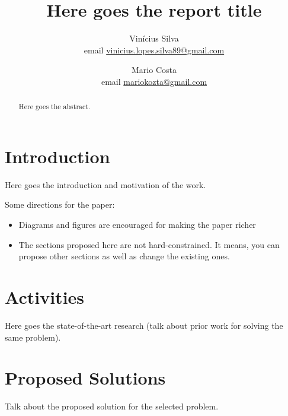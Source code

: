 \documentclass[10pt,twocolumn,letterpaper]{article}
\begin{document}
\title{Here goes the report title}
\author{Vin\'{i}cius Silva \\ email         \href{vinicius.lopes.silva89@gmail.com}{vinicius.lopes.silva89@gmail.com} 
\\ \and
Mario Costa \\ email \href{mariokozta@gmail.com}{mariokozta@gmail.com}
}

\maketitle
\begin{abstract}
Here goes the abstract. 
\end{abstract}

\section{Introduction}
Here goes the introduction and motivation of the work.

Some directions for the paper:

\begin{itemize}
	\item Diagrams and figures are encouraged for making the paper richer
	\item The sections proposed here are not hard-constrained. It means, you 
	can propose other sections as well as change the existing ones. 
\end{itemize}

\section{Activities}
Here goes the state-of-the-art research (talk about prior work for solving the same problem). 

\section{Proposed Solutions}
Talk about the proposed solution for the selected problem. 

\end{document}
